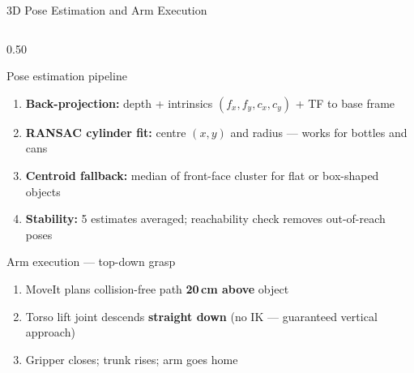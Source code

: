 \documentclass[aspectratio=169, 10pt]{beamer}
\begin{document}
\begin{frame}{3D Pose Estimation and Arm Execution}
  \begin{columns}[T]
    \begin{column}{0.50\textwidth}
      \begin{block}{Pose estimation pipeline}
        \begin{enumerate}\scriptsize
          \item \textbf{Back-projection:} depth + intrinsics
                $(f_x,f_y,c_x,c_y)$ + TF to base frame
          \item \textbf{RANSAC cylinder fit:} centre $(x,y)$
                and radius --- works for bottles and cans
          \item \textbf{Centroid fallback:} median of front-face cluster
                for flat or box-shaped objects
          \item \textbf{Stability:} 5 estimates averaged;
                reachability check removes out-of-reach poses
        \end{enumerate}
      \end{block}

      \vspace{0.05em}
      \begin{block}{Arm execution --- top-down grasp}
        \begin{enumerate}\scriptsize
          \item MoveIt plans collision-free path \textbf{20\,cm above} object
          \item Torso lift joint descends \textbf{straight down}
                (no IK --- guaranteed vertical approach)
          \item Gripper closes; trunk rises; arm goes home
        \end{enumerate}
      \end{block}
    \end{column}


\end{columns}
\end{frame}
\end{document}
